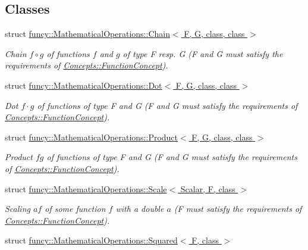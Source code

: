 \subsection*{Classes}
\begin{DoxyCompactItemize}
\item 
struct \hyperlink{structfuncy_1_1MathematicalOperations_1_1Chain}{funcy\-::\-Mathematical\-Operations\-::\-Chain$<$ F, G, class, class $>$}
\begin{DoxyCompactList}\small\item\em Chain $ f\circ g $ of functions $f$ and $g$ of type F resp. G (F and G must satisfy the requirements of \hyperlink{structfuncy_1_1Concepts_1_1FunctionConcept}{Concepts\-::\-Function\-Concept}). \end{DoxyCompactList}\item 
struct \hyperlink{structfuncy_1_1MathematicalOperations_1_1Dot}{funcy\-::\-Mathematical\-Operations\-::\-Dot$<$ F, G, class, class $>$}
\begin{DoxyCompactList}\small\item\em Dot $f \cdot g$ of functions of type F and G (F and G must satisfy the requirements of \hyperlink{structfuncy_1_1Concepts_1_1FunctionConcept}{Concepts\-::\-Function\-Concept}). \end{DoxyCompactList}\item 
struct \hyperlink{structfuncy_1_1MathematicalOperations_1_1Product}{funcy\-::\-Mathematical\-Operations\-::\-Product$<$ F, G, class, class $>$}
\begin{DoxyCompactList}\small\item\em Product $fg$ of functions of type F and G (F and G must satisfy the requirements of \hyperlink{structfuncy_1_1Concepts_1_1FunctionConcept}{Concepts\-::\-Function\-Concept}). \end{DoxyCompactList}\item 
struct \hyperlink{structfuncy_1_1MathematicalOperations_1_1Scale}{funcy\-::\-Mathematical\-Operations\-::\-Scale$<$ Scalar, F, class $>$}
\begin{DoxyCompactList}\small\item\em Scaling $ af $ of some function $ f $ with a double $ a $ (F must satisfy the requirements of \hyperlink{structfuncy_1_1Concepts_1_1FunctionConcept}{Concepts\-::\-Function\-Concept}). \end{DoxyCompactList}\item 
struct \hyperlink{structfuncy_1_1MathematicalOperations_1_1Squared}{funcy\-::\-Mathematical\-Operations\-::\-Squared$<$ F, class $>$}

\end{DoxyCompactItemize}
